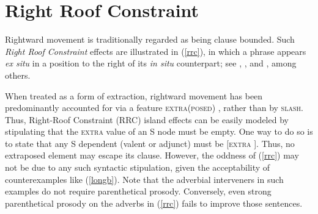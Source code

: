 \documentclass[output=paper,biblatex,babelshorthands,newtxmath,draftmode,colorlinks,citecolor=brown]{langscibook}
\begin{document}



\zl
{}


\section{Right Roof Constraint}

Rightward movement is traditionally regarded as being clause bounded. Such \emph{Right Roof
    Constraint} \citep[Section~5.1.2]{Ross67} effects are illustrated in (\ref{rrc}), in which a
phrase appears \emph{ex situ} in a position to the right of its \emph{in situ} counterpart; see
\citet{akma75}, \citet{baltin78}, and \citet{stowelldiss}, among others.

\eal \label{rrc}
\ex[*]{It was believed \trace$_i$ that [there walked into the room \trace$_j$ ]  [by everyone]$_i$ [a man with  long blond hair]$_j$].\footnote{
\citew[\page 386]{rochemont}}}
\zl



\noindent
When treated as a form of extraction, rightward movement has been predominantly accounted for via a
feature \textsc{extra(posed)} \parencites{kellerverb,Keller95b,Bouma96,eynde96}[Section~13.2]{Mueller99a}{KimSag2005},
rather than by \textsc{slash}.  Thus, Right-Roof Constraint (RRC) island effects can be easily modeled
by stipulating that the \textsc{extra} value of an S node must be empty. One way to do so is to state
that any S dependent (valent or adjunct) must be [\textsc{extra} \eliste].  Thus, no extraposed element
may escape its clause. However, the oddness of (\ref{rrc}) may not be due to any such syntactic
stipulation, given the acceptability of counterexamples like (\ref{longb}). Note that the adverbial
interveners in such examples do not require parenthetical prosody. Conversely, even strong
parenthetical prosody on the adverbs in (\ref{rrc}) fails to improve those sentences.
\end{document}
